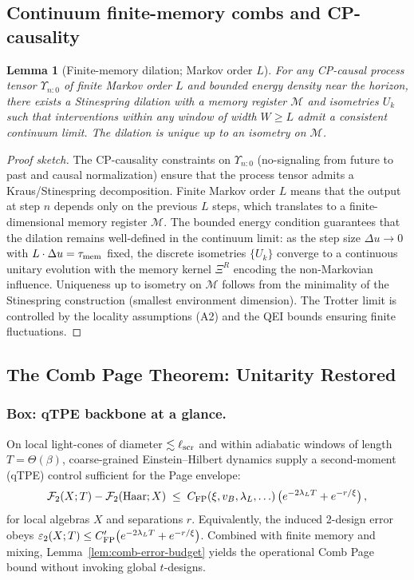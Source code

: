 \documentclass[11pt,a4paper]{article}
\theoremstyle{plain}
\newtheorem{lemma}[theorem]{Lemma}
\theoremstyle{definition}
\theoremstyle{remark}
\begin{document}
\subsection*{Continuum finite-memory combs and CP-causality}
\begin{lemma}[Finite-memory dilation; Markov order $L$]\label{lem:finite-memory-dilation}
For any CP-causal process tensor $\Upsilon_{n:0}$ of finite Markov order $L$ and bounded energy density
near the horizon, there exists a Stinespring dilation with a memory register $\mathcal{M}$ and isometries $U_k$
such that interventions within any window of width $W\!\ge\!L$ admit a consistent continuum limit. The dilation
is unique up to an isometry on $\mathcal{M}$.
\end{lemma}
\begin{proof}[Proof sketch]
The CP-causality constraints on $\Upsilon_{n:0}$ (no-signaling from future to past and causal normalization) ensure that the process tensor admits a Kraus/Stinespring decomposition. Finite Markov order $L$ means that the output at step $n$ depends only on the previous $L$ steps, which translates to a finite-dimensional memory register $\mathcal{M}$. The bounded energy condition guarantees that the dilation remains well-defined in the continuum limit: as the step size $\Delta u\to 0$ with $L\cdot\Delta u=\tau_{\rm mem}$ fixed, the discrete isometries $\{U_k\}$ converge to a continuous unitary evolution with the memory kernel $\Xi^R$ encoding the non-Markovian influence. Uniqueness up to isometry on $\mathcal{M}$ follows from the minimality of the Stinespring construction (smallest environment dimension). The Trotter limit is controlled by the locality assumptions (A2) and the QEI bounds ensuring finite fluctuations.
\end{proof}

\subsection{The Comb Page Theorem: Unitarity Restored}
\label{sec:page_theorem}\label{sec:comb-page}

\subsubsection{Box: qTPE backbone at a glance.}
On local light-cones of diameter \(\lesssim \ell_{\rm scr}\) and within adiabatic windows of length \(T=\Theta(\beta)\),
coarse-grained Einstein--Hilbert dynamics supply a second-moment (qTPE) control sufficient for the Page envelope:
\begin{align*}
\mathcal{F}_2(X;T)-\mathcal{F}_2(\mathrm{Haar};X) \;\le\; C_{\rm FP}(\xi,v_B,\lambda_L,\ldots)\,\big(e^{-2\lambda_L T}+e^{-r/\xi}\big)\,,
\end{align*}
for local algebras \(X\) and separations \(r\). Equivalently, the induced 2-design error obeys
\(\varepsilon_2(X;T)\le C'_{\rm FP}\big(e^{-2\lambda_L T}+e^{-r/\xi}\big)\).
Combined with finite memory and mixing, Lemma~\ref{lem:comb-error-budget} yields the operational Comb Page bound without invoking global \(t\)-designs.
\end{document}
